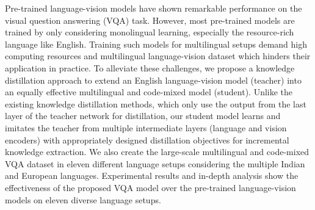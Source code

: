 Pre-trained language-vision models have shown remarkable performance on the visual question answering (VQA) task. However, most pre-trained models are trained by only considering monolingual learning, especially the resource-rich language like English. Training such models for multilingual setups demand high computing resources and multilingual language-vision dataset which hinders their application in practice. To alleviate these challenges, we propose a knowledge distillation approach to extend an English language-vision model (teacher) into an equally effective multilingual and code-mixed model (student). Unlike the existing knowledge distillation methods, which only use the output from the last layer of the teacher network for distillation, our student model learns and imitates the teacher from multiple intermediate layers (language and vision encoders) with appropriately designed distillation objectives for incremental knowledge extraction. We also create the large-scale multilingual and code-mixed VQA dataset in eleven different language setups considering the multiple Indian and European languages. Experimental results and in-depth analysis show the effectiveness of the proposed VQA model over the pre-trained language-vision models on eleven diverse language setups.
